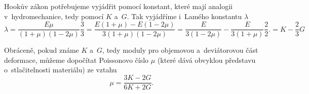 Hookův zákon potřebujeme vyjádřit pomocí konstant, které mají analogii v~hydromechanice, tedy pomocí $K$ a~$G$.
Tak vyjádříme i~Lamého konstantu $\lambda$
\begin{equation}
	\lambda
	= \frac{E \mu}{(1+\mu) (1-2\mu)} \frac{3}{3}
	= \frac{E(1+\mu) - E(1-2\mu)}{3 (1+\mu) (1-2\mu)}
	= \frac{E}{3(1-2\mu)} - \frac{E}{3(1+\mu)} \frac{2}{2}.
	= K - \frac{2}{3} G
\end{equation}

Obráceně, pokud známe $K$ a~$G$, tedy moduly pro objemovou a~deviátorovou část deformace, můžeme dopočítat Poissonovo číslo $\mu$ (které dává obvyklou představu o~stlačitelnosti materiálu) ze vztahu
\begin{equation}
	\mu = \frac{3K - 2G}{6K + 2G}.
\end{equation}
